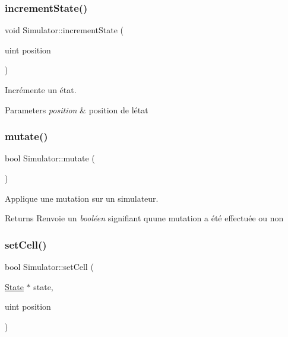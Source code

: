 \subsubsection{\texorpdfstring{increment\+State()}{incrementState()}}
{\footnotesize\ttfamily void Simulator\+::increment\+State (\begin{DoxyParamCaption}\item[{uint}]{position }\end{DoxyParamCaption})}



Incrémente un état. 


\begin{DoxyParams}{Parameters}
{\em position} & position de l\textquotesingle{}état \\
\hline
\end{DoxyParams}
\mbox{\label{class_simulator_ad0c0fbebecd5cf70d1ca82d53f50205e}} 
\subsubsection{\texorpdfstring{mutate()}{mutate()}}
{\footnotesize\ttfamily bool Simulator\+::mutate (\begin{DoxyParamCaption}{ }\end{DoxyParamCaption})\hspace{0.3cm}{\ttfamily [virtual]}}



Applique une mutation sur un simulateur. 

\begin{DoxyReturn}{Returns}
Renvoie un {\itshape booléen} signifiant qu\textquotesingle{}une mutation a été effectuée ou non 
\end{DoxyReturn}
\mbox{\label{class_simulator_afdf446164f5fc9ee2567405377acbea0}} 
\subsubsection{\texorpdfstring{set\+Cell()}{setCell()}}
{\footnotesize\ttfamily bool Simulator\+::set\+Cell (\begin{DoxyParamCaption}\item[{\mbox{\hyperlink{class_state}{State}} $\ast$}]{state,  }\item[{uint}]{position }\end{DoxyParamCaption})}



